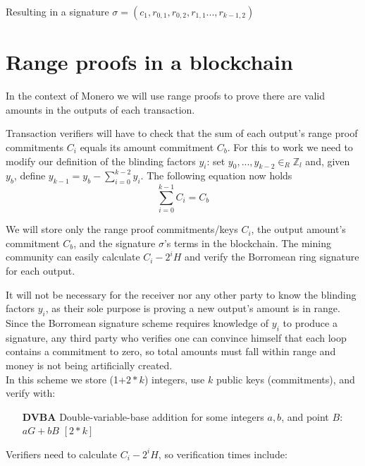 \begin{center}
    Resulting in a signature $\sigma = (c_1, r_{0,1}, r_{0,2}, r_{1,1}..., r_{k-1,2})$
\end{center}


\section{Range proofs in a blockchain}
\label{range_proofs_blockchain_section}

In the context of Monero we will use range proofs to prove there are valid amounts in the outputs of each transaction.

Transaction verifiers will have to check that the sum of each output's range proof commitments $C_i$ equals its amount commitment $C_b$. For this to work we need to modify our definition of the blinding factors $y_i$: set $y_0, ..., y_{k-2} \in_R \mathbb{Z}_l$ and, given $y_b$, define $y_{k-1} = y_b - \sum_{i=0}^{k-2} y_i$. The following equation now holds
\[\sum^{k-1}_{i=0} C_i = C_b\]

We will store only the range proof commitments/keys $C_i$, the output amount's commitment $C_b$, and the signature $\sigma$'s terms in the blockchain. The mining community can easily calculate $C_i - 2^i H$ and verify the Borromean ring signature for each output.

It will not be necessary for the receiver nor any other party to know the blinding factors $y_i$, as their sole purpose is proving a new output's amount is in range. 
\\

Since the Borromean signature scheme requires knowledge of $y_i$ to produce a signature, any third party who verifies one can convince himself that each loop contains a commitment to zero, so total amounts must fall within range and money is not being artificially created.\\

In this scheme we store (1+$2*k$) integers, use $k$ public keys (commitments), and verify with:

\begin{itemize}
    \setlength\itemsep{\listspace}
    \item [\textbf{DVBA}] Double-variable-base addition for some integers $a, b$, and point $B$: $a G + b B$ \quad \([2*k]\)
\end{itemize}

Verifiers need to calculate $C_i - 2^i H$, so verification times include:

